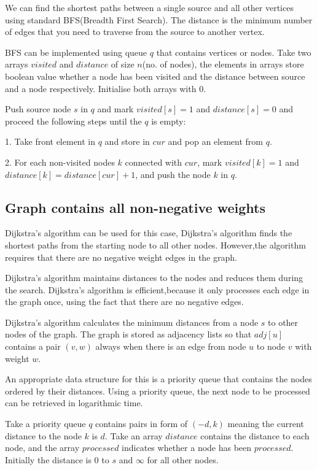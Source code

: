 \documentclass[conference]{IEEEtran}
\begin{document}
We can find the shortest paths between a single source and all other vertices using standard BFS(Breadth First Search). The distance is the minimum number of edges that you need to traverse from the source to another vertex.

BFS can be implemented using queue $q$ that contains vertices or nodes. Take two arrays $visited$ and $distance$ of size $n$(no. of nodes), the elements in arrays store boolean value whether a node has been visited and the distance between source and a node respectively. Initialise both arrays with $0$.

Push source node $s$ in $q$ and mark $visited[s] = 1$ and $distance[s] = 0$ and proceed the following steps until the $q$ is empty:

1. Take front element in $q$ and store in $cur$ and pop an element from $q$.

2. For each non-visited nodes $k$ connected with $cur$, mark $visited[k]=1$ and $distance[k]=distance[cur]+1$, and push the node $k$ in $q$.


\subsection{Graph contains all non-negative weights}

Dijkstra’s algorithm can be used for this case, Dijkstra's algorithm finds the shortest paths from the starting node to all other nodes. However,the algorithm requires that there are no negative weight edges in the graph. 

Dijkstra’s algorithm maintains distances to the nodes and reduces them during the search. Dijkstra’s algorithm is efficient,because it only processes each edge in the graph once, using the fact that there are no negative edges.

Dijkstra’s algorithm calculates the minimum
distances from a node $s$ to other nodes of the graph.
The graph is stored as adjacency lists so that $adj[u]$ contains a pair $(v,w)$ always when there is an edge from node $u$ to node $v$ with weight $w$.

An appropriate data structure for this is a priority queue that contains the nodes
ordered by their distances. Using a priority queue, the next node to be processed
can be retrieved in logarithmic time.

Take a priority queue $q$ contains pairs in form of $(-d,k)$ meaning the current distance to the node $k$ is $d$. Take an array $distance$ contains
the distance to each node, and the array $processed$ indicates whether a node has
been $processed$. Initially the distance is $0$ to $s$ and $\infty$ for all other nodes.
\end{document}
